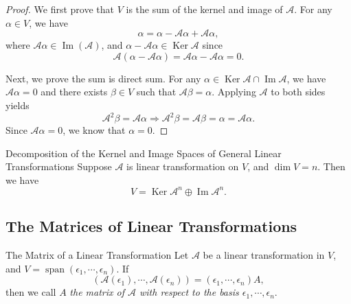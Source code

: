 \begin{proof}
  We first prove that $V$ is the sum of the kernel and image of $\mathcal{A}$.
  For any $\alpha \in V$, we have
  \begin{equation}
  \alpha = \alpha - \mathcal{A} \alpha + \mathcal{A} \alpha,
  \end{equation}
  where $\mathcal{A} \alpha \in \operatorname{Im}(\mathcal{A})$,
  and $\alpha - \mathcal{A}\alpha \in \operatorname{Ker}\mathcal{A}$ since
  \begin{equation}
    \mathcal{A}(\alpha - \mathcal{A} \alpha) = \mathcal{A} \alpha - \mathcal{A} \alpha = 0.
  \end{equation}

  Next, we prove the sum is direct sum.
  For any $\alpha \in \operatorname{Ker} \mathcal{A} \cap \operatorname{Im}
  \mathcal{A}$,
  we have $\mathcal{A} \alpha = 0$ and there exists $\beta \in V$ such that
  $\mathcal{A} \beta = \alpha$.
  Applying $\mathcal{A}$ to both sides yields
  \begin{equation}
    \mathcal{A}^2 \beta = \mathcal{A} \alpha \Rightarrow
    \mathcal{A}^2 \beta = \mathcal{A} \beta = \alpha = \mathcal{A} \alpha.
  \end{equation}
  Since $\mathcal{A} \alpha = 0$, we know that $\alpha = 0$.
\end{proof}

\begin{theorem}{Decomposition of the Kernel and Image Spaces of General Linear Transformations}{}
  Suppose $\mathcal{A}$ is linear transformation on $V$,
  and $\dim V = n$. Then we have
  \begin{equation}
    V = \operatorname{Ker} \mathcal{A}^n \oplus \operatorname{Im} \mathcal{A}^n.
  \end{equation}
\end{theorem}

\subsection{The Matrices of Linear Transformations}

\begin{definition}{The Matrix of a Linear Transformation}{}
  Let $\mathcal{A}$ be a linear transformation in $V$,
  and $V = \operatorname{span} (\epsilon_1,\cdots,\epsilon_n)$.
  If
  \begin{equation}
    (\mathcal{A}(\epsilon_1),\cdots,\mathcal{A}(\epsilon_n)) = (\epsilon_1,\cdots,\epsilon_n)A,
  \end{equation}
  then we call $A$ \emph{the matrix of $\mathcal{A}$ with respect to the basis $\epsilon_1,\cdots,\epsilon_n$}.
\end{definition}

